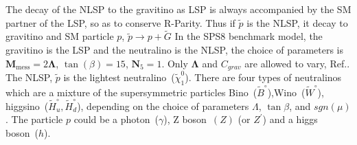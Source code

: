 {%
The decay of the NLSP to the gravitino as LSP is always accompanied by the SM partner of the LSP, so as to conserve R-Parity.
Thus if $\tilde{p}$ is the NLSP, it decay to gravitino and SM particle $p$, $ \tilde{p}\rightarrow p + \tilde{G}$
In the SPS8 benchmark model, the gravitino is the LSP and the neutralino is the NLSP,
the choice of parameters is  $\mathbf{M}_{\mbox{mess}} = 2\mathbf{\Lambda}$, $ \tan(\beta)=15$, $\mathbf{N}_{5}=1$.
Only $\mathbf{\Lambda}$ and $C_{grav}$ are allowed to vary, Ref.\cite{SUSY}.
The NLSP, $\tilde{p}$ is the lightest neutralino~($\tilde{\chi}^{0}_{1}$). 
There are four types of neutralinos which are a mixture of the supersymmetric particles Bino~($\tilde{B}^{\circ}$),Wino~($\tilde{W}^{\circ}$), higgsino~($\tilde{H}^{\circ}_{u},\tilde{H}^{\circ}_{d}$), depending on the choice of parameters  $\Lambda$, $\tan\beta$, and $sgn(\mu)$.
The particle $p$ could be a photon~($\gamma$), Z boson~$(Z)$ (or $Z^{\prime}$) and a higgs boson~($h$).
}
